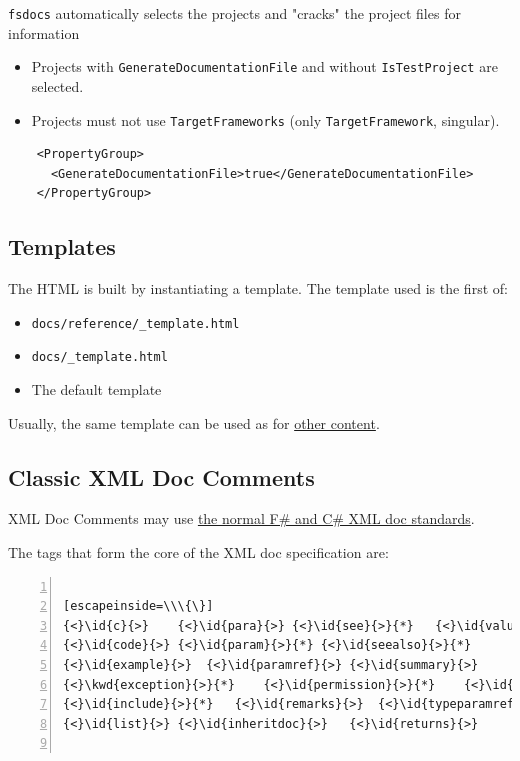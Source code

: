 \documentclass{article}
\newcommand{\id}[1]{\textcolor{black}{#1}}
\newcommand{\kwd}[1]{\textcolor{navy}{#1}}
\begin{document}
\texttt{fsdocs} automatically selects the projects and "cracks" the project files for information
\begin{itemize}
\item Projects with \texttt{GenerateDocumentationFile} and without \texttt{IsTestProject} are selected.

\item Projects must not use \texttt{TargetFrameworks} (only \texttt{TargetFramework}, singular).

\end{itemize}

\begin{lstlisting}
    <PropertyGroup>
      <GenerateDocumentationFile>true</GenerateDocumentationFile>
    </PropertyGroup>

\end{lstlisting}
\subsection*{Templates}



The HTML is built by instantiating a template. The template used is the first of:
\begin{itemize}
\item 

\texttt{docs/reference/\_template.html}

\item 

\texttt{docs/\_template.html}

\item 

The default template

\end{itemize}



Usually, the same template can be used as for \href{content.html}{other content}.
\subsection*{Classic XML Doc Comments}



XML Doc Comments may use \href{https://learn.microsoft.com/en-us/dotnet/csharp/programming-guide/xmldoc/}{the normal F\# and C\# XML doc standards}.


The tags that form the core of the XML doc specification are:
\begin{lstlisting}[numbers=left]

[escapeinside=\\\{\}]
{<}\id{c}{>}	{<}\id{para}{>}	{<}\id{see}{>}{*}	{<}\id{value}{>}
{<}\id{code}{>}	{<}\id{param}{>}{*}	{<}\id{seealso}{>}{*}
{<}\id{example}{>}	{<}\id{paramref}{>}	{<}\id{summary}{>}
{<}\kwd{exception}{>}{*}	{<}\id{permission}{>}{*}	{<}\id{typeparam}{>}{*}
{<}\id{include}{>}{*}	{<}\id{remarks}{>}	{<}\id{typeparamref}{>}
{<}\id{list}{>}	{<}\id{inheritdoc}{>}	{<}\id{returns}{>}


\end{lstlisting}
\end{document}

